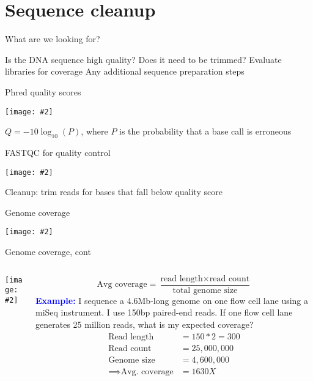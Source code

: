\documentclass{beamer}
\renewcommand{\c}[1]{\begin{center}#1\end{center}}
\newcommand{\blu}[1]{\textcolor{blue}{\textbf{#1}}}
\newcommand{\gr}[2][.95]{\c{\texttt{[image: \#2]}}}
\begin{document}
\section{Sequence cleanup}

\begin{frame}{What are we looking for?}
\begin{outline}
    \1 Is the DNA sequence high quality? Does it need to be trimmed?
    \1 Evaluate libraries for coverage
    \1 Any additional sequence preparation steps
\end{outline}
\end{frame}

\begin{frame}{Phred quality scores}
\gr{l4_figs/s8_scores.png}
$Q = -10 \log_{10}(P)$, where $P$ is the probability that a base call is erroneous
\end{frame}

\begin{frame}{FASTQC for quality control}
\gr{l4_figs/s9_fastqc.png}
Cleanup: trim reads for bases that fall below quality score
\end{frame}

\begin{frame}{Genome coverage}
\gr[0.5]{l4_figs/s10_coverage.png}
\end{frame}

\begin{frame}{Genome coverage, cont}
\begin{columns}
\begin{column}{0.5\textwidth}
    \gr{l4_figs/s11_sequencers.png}
\end{column}
\begin{column}{0.5\textwidth}
    \footnotesize
    \[
        \text{Avg coverage} = \frac{\text{read length} \times \text{read count}}{\text{total genome size}}
    \]
    \blu{Example:} I sequence a 4.6Mb-long genome on one flow cell lane using a miSeq instrument. I use 150bp paired-end reads. If one flow cell lane generates 25 million reads, what is my expected coverage?
    \begin{align*}
        \text{Read length} &= 150 * 2 = 300\\
        \text{Read count} &= 25,000,000\\
        \text{Genome size} &= 4,600,000\\
        \implies \text{Avg. coverage} &= 1630X
    \end{align*}
\end{column}
\end{columns}
\end{frame}
\end{document}
